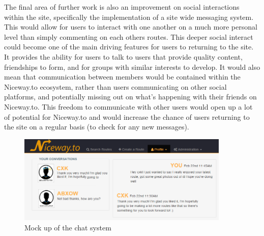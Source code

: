 \noindent 
The final area of further work is also an improvement on social interactions within the site, specifically the implementation of a site wide messaging system. This would allow for users to interact with one another on a much more personal level than simply commenting on each others routes. This deeper social interact could become one of the main driving features for users to returning to the site. It provides the ability for users to talk to users that provide quality content, friendships to form, and for groups with similar interests to develop. It would also mean that communication between members would be contained within the Niceway.to ecosystem, rather than users communicating on other social platforms, and potentially missing out on what's happening with their friends on Niceway.to. This freedom to communicate with other users would open up a lot of potential for Niceway.to and would increase the chance of users returning to the site on a regular basis (to check for any new messages).

\begin{figure}[!ht]
	\begin{center}
		\includegraphics[width=0.9\textwidth]{images/further/chat.png}
	\end{center}
	\vspace{-6mm}
	\caption{Mock up of the chat system}	
\end{figure}